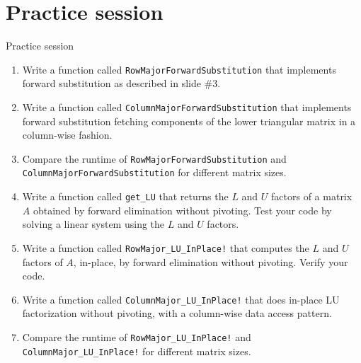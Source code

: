 \documentclass[t,usepdftitle=false]{beamer}
\begin{document}
\section{Practice session}

\begin{frame}[fragile]{Practice session}
\begin{enumerate}
\item Write a function called \texttt{RowMajorForwardSubstitution} that implements forward substitution as described in slide \#3.
\item Write a function called \texttt{ColumnMajorForwardSubstitution} that implements forward substitution fetching components of the lower triangular matrix in a column-wise fashion.
\item Compare the runtime of \texttt{RowMajorForwardSubstitution} and \texttt{ColumnMajorForwardSubstitution} for different matrix sizes.
\item Write a function called \texttt{get_LU} that returns the $L$ and $U$ factors of a matrix $A$ obtained by forward elimination without pivoting. Test your code by solving a linear system using the $L$ and $U$ factors.
\item Write a function called \texttt{RowMajor_LU_InPlace!} that computes the $L$ and $U$ factors of $A$, in-place, by forward elimination without pivoting.
Verify your code.
\item Write a function called \texttt{ColumnMajor_LU_InPlace!} that does in-place LU factorization without pivoting, with a column-wise data access pattern.
\item Compare the runtime of \texttt{RowMajor_LU_InPlace!} and \texttt{ColumnMajor_LU_InPlace!} for different matrix sizes.
\end{enumerate}
\end{frame}
\end{document}
